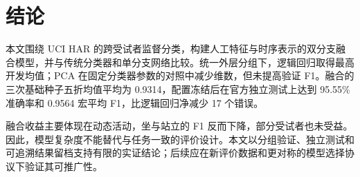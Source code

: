 \section{结论}
本文围绕 UCI HAR 的跨受试者监督分类，构建人工特征与时序表示的双分支融合模型，并与传统分类器和单分支网络比较。统一外层分组下，逻辑回归取得最高开发均值；PCA 在固定分类器参数的对照中减少维数，但未提高验证 F1。融合的三次基础种子五折均值平均为 0.9314，配置冻结后在官方独立测试上达到 95.55\% 准确率和 0.9564 宏平均 F1，比逻辑回归净减少 17 个错误。

融合收益主要体现在动态活动，坐与站立的 F1 反而下降，部分受试者也未受益。因此，模型复杂度不能替代与任务一致的评价设计。本文以分组验证、独立测试和可追溯结果留档支持有限的实证结论；后续应在新评价数据和更对称的模型选择协议下验证其可推广性。
